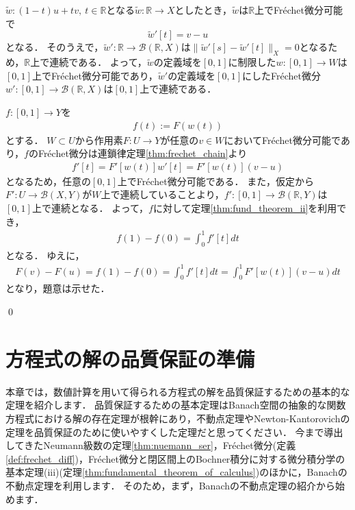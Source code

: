 \begin{Proof}
$\tilde{w}: (1 - t) u + t v, ~ t \in {\mathbb R}$となる$\tilde{w}: {\mathbb R} \rightarrow X$としたとき，$\tilde{w}$は${\mathbb R}$上でFr\'echet微分可能で
\[
	\tilde{w}'[t] = v - u
\]
となる．
そのうえで，$\tilde{w}' : {\mathbb R} \rightarrow {\mathcal B}({\mathbb R}, X)$は$\| \tilde{w}'[s] - \tilde{w}'[t] \|_{X} = 0$となるため，${\mathbb R}$上で連続である．
よって，$\tilde{w}$の定義域を$[0, 1]$に制限した$w:[0, 1] \rightarrow W$は$[0, 1]$上でFr\'echet微分可能であり，$\tilde{w}'$の定義域を$[0,1]$にしたFr\'echet微分$w' : [0, 1] \rightarrow {\mathcal B}({\mathbb R}, X)$は$[0, 1]$上で連続である．

$f: [0, 1] \rightarrow Y$を
\begin{align*}
	f(t) := F(w(t))
\end{align*}
とする．
$W \subset U$から作用素$F:U \rightarrow Y$が任意の$v \in W$においてFr\'echet微分可能であり，$f$のFr\'echet微分は連鎖律定理\ref{thm:frechet_chain}より
\begin{align*}
	f'[t] = F'[w(t)]w'[t] = F'[w(t)]( v - u)
\end{align*}
となるため，任意の$[0, 1]$上でFr\'echet微分可能である．
また，仮定から$F': U \rightarrow {\mathcal B}(X, Y)$が$W$上で連続していることより，$f':[0, 1] \rightarrow {\mathcal B}({\mathbb R}, Y)$は$[0, 1]$上で連続となる．
よって，$f$に対して定理\ref{thm:fund_theorem_ii}を利用でき，
\begin{align*}
	f(1) - f(0) = \int_0^1 f'[t] dt
\end{align*}
となる．
ゆえに，
\begin{align*}
	F(v)  - F(u) = f(1) - f(0) = \int_0^1 f'[t] dt = \int_0^1 F'[w(t)]( v - u) dt
\end{align*}
となり，題意は示せた．

\qed
\end{Proof}


%
\newpage
\section{方程式の解の品質保証の準備}
本章では，数値計算を用いて得られる方程式の解を品質保証するための基本的な定理を紹介します．
品質保証するための基本定理はBanach空間の抽象的な関数方程式における解の存在定理が根幹にあり，不動点定理やNewton-Kantorovichの定理を品質保証のために使いやすくした定理だと思ってください．
今まで導出してきたNeumann級数の定理\ref{thm:nuemann_ser}，Fr\'echet微分(定義\ref{def:frechet_diff})，Fr\'echet微分と閉区間上のBochner積分に対する微分積分学の基本定理(iii)(定理\ref{thm:fundamental_theorem_of_calculus})のほかに，Banachの不動点定理を利用します．
そのため，まず，Banachの不動点定理の紹介から始めます．



